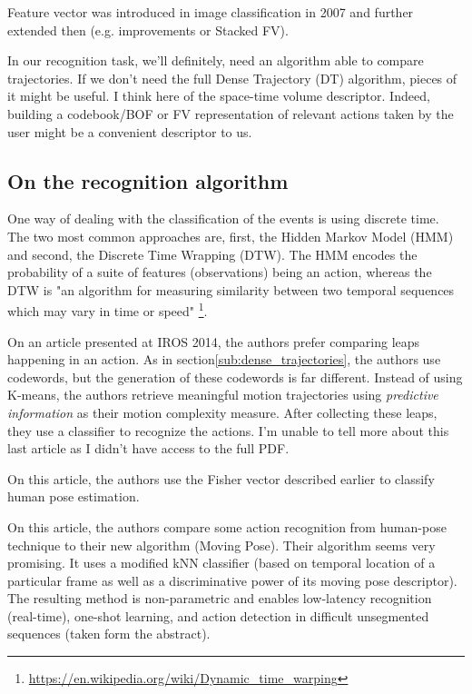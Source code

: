 \documentclass[a4paper]{article}
\begin{document}
			Feature vector was introduced in image classification in 2007\cite{perronnin2007fisher} and further extended then (e.g. improvements\cite{perronnin2010improving} or Stacked FV\cite{peng2014action}). 

			\begin{mdframed}[backgroundcolor = gray!30]
				In our recognition task, we'll definitely, need an algorithm able to compare trajectories. If we don't need the full Dense Trajectory (DT) algorithm, pieces of it might be useful. I think here of the space-time volume descriptor. Indeed, building a codebook/BOF or FV representation of relevant actions taken by the user might be a convenient descriptor to us.
			\end{mdframed}



		\subsection{On the recognition algorithm}
		\label{sub:reco_algo}
			One way of dealing with the classification of the events is using discrete time. The two most common approaches are, first, the Hidden Markov Model (HMM) and second, the Discrete Time Wrapping (DTW). The HMM encodes the probability of a suite of features (observations) being an action, whereas the DTW is "an algorithm for measuring similarity between two temporal sequences which may vary in time or speed" \footnote{\url{https://en.wikipedia.org/wiki/Dynamic_time_warping}}.

			On an article\cite{kwon2014complexity} presented at IROS 2014, the authors prefer comparing leaps happening in an action. As in section\ref{sub:dense_trajectories}, the authors use codewords, but the generation of these codewords is far different. Instead of using K-means, the authors retrieve meaningful motion trajectories using \textit{predictive information}\cite{bialek2001predictability} as their motion complexity measure. After collecting these leaps, they use a classifier to recognize the actions. I'm unable to tell more about this last article as I didn't have access to the full PDF.


			On this article\cite{cheron2015p}, the authors use the Fisher vector described earlier to classify human pose estimation.

			On this article\cite{zanfir2013moving}, the authors compare some action recognition from human-pose technique to their new algorithm (Moving Pose). Their algorithm seems very promising. It uses a modified kNN classifier (based on temporal location of a particular frame as well as a discriminative power of its moving pose descriptor). The resulting method is non-parametric and enables low-latency recognition (real-time), one-shot learning, and action detection in difficult unsegmented sequences (taken form the abstract). 
\end{document}
